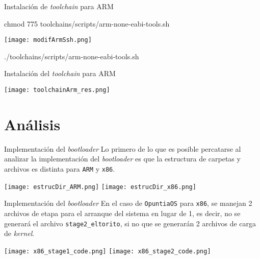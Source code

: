 \begin{frame}{Instalación de \textit{toolchain} para ARM}
	\begin{center}
		\ttfamily
		chmod 775 toolchains/scripts/arm-none-eabi-tools.sh
		
		
		
		\texttt{[image: modifArmSsh.png]}
		
		
		
		./toolchains/scripts/arm-none-eabi-tools.sh
	\end{center}
\end{frame}

\begin{frame}{Instalación del \textit{toolchain} para ARM}
	\begin{center}
		\texttt{[image: toolchainArm\_res.png]}
	\end{center}
\end{frame}




\section{Análisis}
\begin{frame}{}
	
\end{frame}

\begin{frame}{Implementación del \textit{bootloader}}
	Lo primero de lo que es posible percatarse al analizar la implementación del \textit{bootloader} es que la estructura de carpetas y archivos es distinta para \texttt{ARM} y \texttt{x86}.
	\begin{center}
		\texttt{[image: estrucDir\_ARM.png]}
		\hspace{0.5cm}
		\texttt{[image: estrucDir\_x86.png]}
	\end{center}
\end{frame}

\begin{frame}{Implementación del \textit{bootloader}}
	En el caso de \texttt{OpuntiaOS} para \texttt{x86}, se manejan 2 archivos de etapa para el arranque del sistema en lugar de 1, es decir, no se generará el archivo \texttt{stage2\_eltorito}, si no que se generarán 2 archivos de carga de \textit{kernel}.
	\begin{center}
		\texttt{[image: x86\_stage1\_code.png]}
		\hspace{0.5cm}
		\texttt{[image: x86\_stage2\_code.png]}
	\end{center}
\end{frame}

